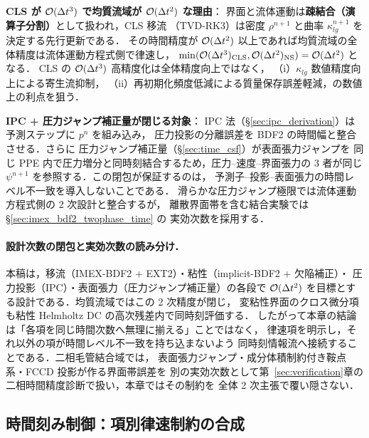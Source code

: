 \noindent\textbf{CLS が $\mathcal{O}(\Delta t^3)$ で均質流域が $\mathcal{O}(\Delta t^2)$ な理由}：
界面と流体運動は\textbf{疎結合（演算子分割）}として扱われ，CLS 移流
（TVD-RK3）は密度 $\rho^{n+1}$ と曲率 $\kappa_{lg}^{n+1}$ を決定する先行更新である．
その時間精度が $\mathcal{O}(\Delta t^2)$ 以上であれば均質流域の全体精度は流体運動方程式側で律速し，
$\min(\mathcal{O}(\Delta t^3)_{\mathrm{CLS}},\mathcal{O}(\Delta t^2)_{\mathrm{NS}}) = \mathcal{O}(\Delta t^2)$
となる．
CLS の $\mathcal{O}(\Delta t^3)$ 高精度化は全体精度向上ではなく，
（i）$\kappa_{lg}$ 数値精度向上による寄生流抑制，
（ii）再初期化頻度低減による質量保存誤差軽減，の数値上の利点を狙う．

\noindent\textbf{IPC + 圧力ジャンプ補正量が閉じる対象}：
IPC 法（§\ref{sec:ipc_derivation}）は予測ステップに $p^n$ を組み込み，
圧力投影の分離誤差を BDF2 の時間幅と整合させる．さらに
圧力ジャンプ補正量（§\ref{sec:time_csf}）が表面張力ジャンプを
同じ PPE 内で圧力増分と同時刻結合するため，圧力--速度--界面張力の
3 者が同じ $\psi^{n+1}$ を参照する．この閉包が保証するのは，
予測子--投影--表面張力の時間レベル不一致を導入しないことである．
滑らかな圧力ジャンプ極限では流体運動方程式側の 2 次設計と整合するが，
離散界面帯を含む結合実験では §\ref{sec:imex_bdf2_twophase_time} の
実効次数を採用する．

\paragraph{設計次数の閉包と実効次数の読み分け．}
本稿は，移流（IMEX-BDF2 + EXT2）・粘性（implicit-BDF2 + 欠陥補正）・
圧力投影（IPC）・表面張力（圧力ジャンプ補正量）の各段で
$\mathcal{O}(\Delta t^2)$ を目標とする設計である．均質流域ではこの 2 次精度が閉じ，
変粘性界面のクロス微分項も粘性 Helmholtz DC の高次残差内で同時刻評価する．
したがって本章の結論は「各項を同じ時間次数へ無理に揃える」ことではなく，
律速項を明示し，それ以外の項が時間レベル不一致を持ち込まないよう
同時刻情報流へ接続することである．二相毛管結合域では，
表面張力ジャンプ・成分体積制約付き鞍点系・FCCD 投影が作る界面帯誤差を
別の実効次数として第~\ref{sec:verification}章の二相時間精度診断で扱い，本章ではその制約を
全体 2 次主張で覆い隠さない．

\subsection{時間刻み制御：項別律速制約の合成}
\label{sec:time_guide}
\label{sec:dt_synthesis}
\label{sec:stability}

